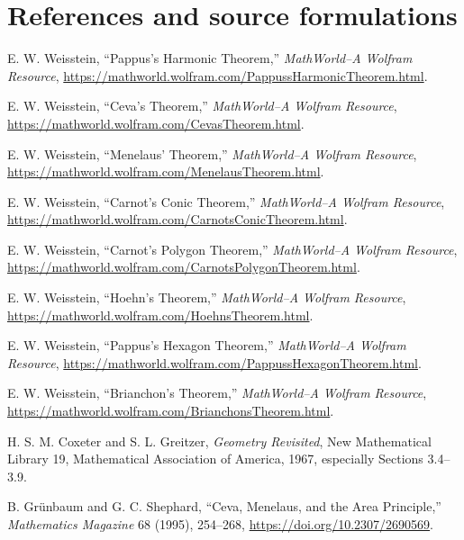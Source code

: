 \section{References and source formulations}

\begin{enumerate}[label={[\arabic*]}]
\item E. W. Weisstein, ``Pappus's Harmonic Theorem,'' \emph{MathWorld--A
Wolfram Resource},
\url{https://mathworld.wolfram.com/PappussHarmonicTheorem.html}.

\item E. W. Weisstein, ``Ceva's Theorem,'' \emph{MathWorld--A Wolfram
Resource}, \url{https://mathworld.wolfram.com/CevasTheorem.html}.

\item E. W. Weisstein, ``Menelaus' Theorem,'' \emph{MathWorld--A Wolfram
Resource}, \url{https://mathworld.wolfram.com/MenelausTheorem.html}.

\item E. W. Weisstein, ``Carnot's Conic Theorem,'' \emph{MathWorld--A
Wolfram Resource},
\url{https://mathworld.wolfram.com/CarnotsConicTheorem.html}.

\item E. W. Weisstein, ``Carnot's Polygon Theorem,'' \emph{MathWorld--A
Wolfram Resource},
\url{https://mathworld.wolfram.com/CarnotsPolygonTheorem.html}.

\item E. W. Weisstein, ``Hoehn's Theorem,'' \emph{MathWorld--A Wolfram
Resource}, \url{https://mathworld.wolfram.com/HoehnsTheorem.html}.

\item E. W. Weisstein, ``Pappus's Hexagon Theorem,'' \emph{MathWorld--A
Wolfram Resource},
\url{https://mathworld.wolfram.com/PappussHexagonTheorem.html}.

\item E. W. Weisstein, ``Brianchon's Theorem,'' \emph{MathWorld--A Wolfram
Resource}, \url{https://mathworld.wolfram.com/BrianchonsTheorem.html}.

\item H. S. M. Coxeter and S. L. Greitzer, \emph{Geometry Revisited},
New Mathematical Library 19, Mathematical Association of America, 1967,
especially Sections 3.4--3.9.

\item B. Gr\"unbaum and G. C. Shephard, ``Ceva, Menelaus, and the Area
Principle,'' \emph{Mathematics Magazine} 68 (1995), 254--268,
\url{https://doi.org/10.2307/2690569}.


\end{enumerate}
